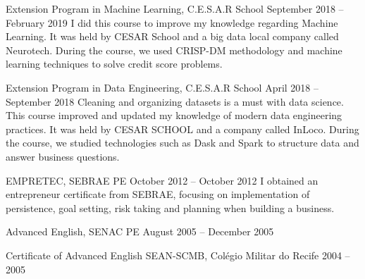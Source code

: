 
\cvmetaevent
{Extension Program in Machine Learning, C.E.S.A.R School}
{September 2018 – February 2019}
{}
{I did this course to improve my knowledge regarding Machine Learning. It was held by CESAR School and a big data local company called Neurotech. During the course, we used CRISP-DM methodology and machine learning techniques to solve credit score problems.}

\cvmetaevent
{Extension Program in Data Engineering, C.E.S.A.R School}
{April 2018 – September 2018}
{}
{Cleaning and organizing datasets is a must with data science. This course improved and updated my knowledge of modern data engineering practices. It was held by CESAR SCHOOL and a company called InLoco. During the course, we studied technologies such as Dask and Spark to structure data and answer business questions.}

\cvmetaevent
{EMPRETEC, SEBRAE PE}
{October 2012 – October 2012}
{}
{I obtained an entrepreneur certificate from SEBRAE, focusing on implementation of persistence, goal setting, risk taking and planning when building a business.}

\cvmetaevent
{Advanced English, SENAC PE}
{August 2005 – December 2005}
{}
{}

\cvmetaevent
{Certificate of Advanced English SEAN-SCMB, Colégio Militar do Recife}
{2004 – 2005}
{}
{}
